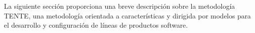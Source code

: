 


La siguiente sección proporciona una breve descripción sobre la metodología TENTE, una metodología orientada a características y dirigida por modelos para el desarrollo y configuración de líneas de productos software.
